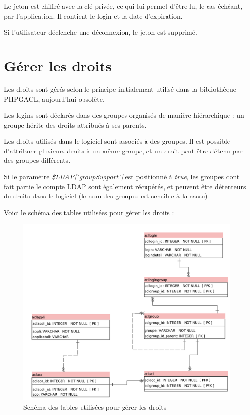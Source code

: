 Le jeton est chiffré avec la clé privée, ce qui lui permet d'être lu, le cas échéant, par l'application. Il contient le login et la date d'expiration. 

Si l'utilisateur déclenche une déconnexion, le jeton est supprimé.

\section{Gérer les droits}

Les droits sont gérés selon le principe initialement utilisé dans la bibliothèque PHPGACL, aujourd'hui obsolète. 

Les logins sont déclarés dans des groupes organisés de manière hiérarchique : un groupe hérite des droits attribués à ses parents.

Les droits utilisés dans le logiciel sont associés à des groupes. Il est possible d'attribuer plusieurs droits à un même groupe, et un droit peut être détenu par des groupes différents.

Si le paramètre \textit{\$LDAP["groupSupport"]} est positionné à \textit{true}, les groupes dont fait partie le compte LDAP sont également récupérés, et peuvent être détenteurs de droits dans le logiciel (le nom des groupes est sensible à la casse).

Voici le schéma des tables utilisées pour gérer les droits :

\begin{figure}[H]
\includegraphics[width=\linewidth]{dessin/acl_only}
\caption{Schéma des tables utilisées pour gérer les droits}
\end{figure}

